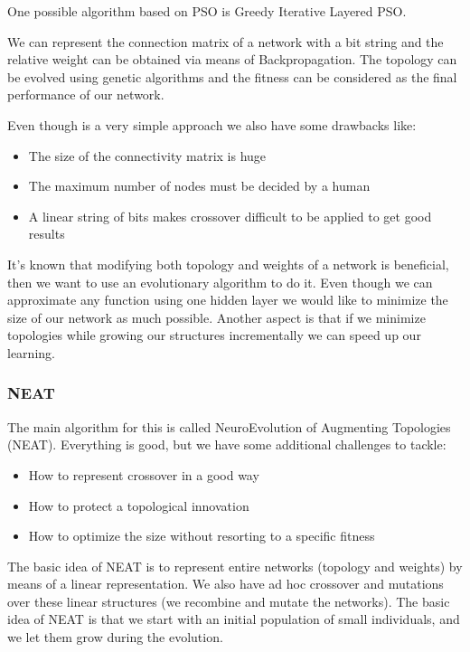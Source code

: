 One possible algorithm based on PSO is Greedy Iterative Layered PSO.

\vspace{10pt}

We can represent the connection matrix of a network with a bit string and the relative weight can be obtained via means of Backpropagation. The topology can be evolved using genetic algorithms and the fitness can be considered as the final performance of our network. 

\vspace{10pt}

Even though is a very simple approach we also have some drawbacks like:

\begin{itemize}
    \item The size of the connectivity matrix is huge
    \item The maximum number of nodes must be decided by a human
    \item A linear string of bits makes crossover difficult to be applied to get good results
\end{itemize}

It's known that modifying both topology and weights of a network is beneficial, then we want to use an evolutionary algorithm to do it. Even though we can approximate any function using one hidden layer we would like to minimize the size of our network as much possible. Another aspect is that if we minimize topologies while growing our structures incrementally we can speed up our learning. 

\subsubsection{NEAT}

The main algorithm for this is called NeuroEvolution of Augmenting Topologies (NEAT). Everything is good, but we have some additional challenges to tackle:

\begin{itemize}
    \item How to represent crossover in a good way
    \item How to protect a topological innovation
    \item How to optimize the size without resorting to a specific fitness
\end{itemize}

The basic idea of NEAT is to represent entire networks (topology and weights) by means of a linear representation. We also have ad hoc crossover and mutations over these linear structures (we recombine and mutate the networks). The basic idea of NEAT is that we start with an initial population of small individuals, and we let them grow during the evolution.

